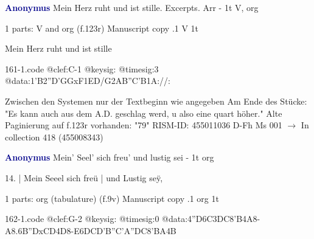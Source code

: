 \documentclass[twocolumn]{book}
\begin{document}
\newline \par \vspace{7pt} \textcolor{darkblue}{\textbf{Anonymus  }}
\newline Mein Herz ruht und ist stille. Excerpts. Arr - 1t
\newline V, org
\newline \begin{itshape}\end{itshape} 
\newline \textcolor{darkblue}{}  1 parts: V and org  (f.123r)
\newline Manuscript copy
.1  V  1t
\newline \begin{footnotesize} Mein Herz ruht und ist stille \end{footnotesize}  
\begin{filecontents*}{161-1.code}
@clef:C-1
@keysig:
@timesig:3
@data:1'B2''D'GGxF1ED/G2AB''C'B1A://:
\end{filecontents*}
\newline
%

\newline Zwischen den Systemen nur der Textbeginn wie angegeben
\newline Am Ende des Stücke: "Es kann auch aus dem A.D. geschlag werd, u also eine quart höher."
\newline Alte Paginierung auf f.123r vorhanden: "79"
\newline RISM-ID: 455011036
\newline D-Fh  Ms 001
\newline $\rightarrow$ In collection 418 (455008343)
      
\newline \par \vspace{7pt} \textcolor{darkblue}{\textbf{Anonymus  }}
\newline Mein' Seel' sich freu' und lustig sei - 1t
\newline org
\newline \begin{itshape}[f.9v, at left:] 14. | Mein Seeel sich freü | und Lustig seÿ,\end{itshape} 
\newline \textcolor{darkblue}{}  1 parts: org (tabulature)  (f.9v)
\newline Manuscript copy
.1  org  1t  
\begin{filecontents*}{162-1.code}
@clef:G-2
@keysig:
@timesig:0
@data:4''D{6C3DC8'B}4A8-A{8.6B''DxCD}4D8-E{6DCD'B}{''C'A''DC}{8'BA}4B
\end{filecontents*}
\newline
%
\end{document}
